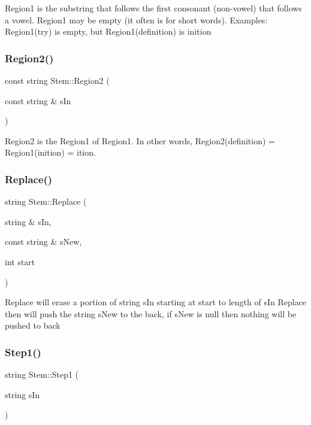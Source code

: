 Region1 is the substring that follows the first consonant (non-\/vowel) that follows a vowel. Region1 may be empty (it often is for short words). Examples\+: Region1(try) is empty, but Region1(definition) is inition \mbox{\label{class_stem_a343616cfb550f5c192b4dbbb8f79789b}} 
\subsubsection{\texorpdfstring{Region2()}{Region2()}}
{\footnotesize\ttfamily const string Stem\+::\+Region2 (\begin{DoxyParamCaption}\item[{const string \&}]{s\+In }\end{DoxyParamCaption})}

Region2 is the Region1 of Region1. In other words, Region2(definition) = Region1(inition) = ition. \mbox{\label{class_stem_a3715bc3610477aaa57db94909717af84}} 
\subsubsection{\texorpdfstring{Replace()}{Replace()}}
{\footnotesize\ttfamily string Stem\+::\+Replace (\begin{DoxyParamCaption}\item[{string \&}]{s\+In,  }\item[{const string \&}]{s\+New,  }\item[{int}]{start }\end{DoxyParamCaption})}

Replace will erase a portion of string s\+In starting at start to length of s\+In Replace then will push the string s\+New to the back, if s\+New is null then nothing will be pushed to back \mbox{\label{class_stem_af3092c54c7551ab083c335d7dbb94c86}} 
\subsubsection{\texorpdfstring{Step1()}{Step1()}}
{\footnotesize\ttfamily string Stem\+::\+Step1 (\begin{DoxyParamCaption}\item[{string}]{s\+In }\end{DoxyParamCaption})}

